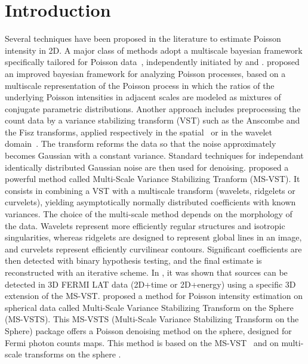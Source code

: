 \chapter{Introduction}
\label{ch_msvst_intro}

Several techniques have been proposed in the literature to estimate Poisson intensity in 2D. A major class of methods adopt a multiscale bayesian framework specifically tailored for Poisson data~\citep{Nowak2000}, independently initiated by \citet{wave:timmermann99} and \citet{Kolaczyk1999}. \citet{Lefkimmiatis} proposed an improved bayesian framework for analyzing Poisson processes, based on a multiscale representation of the Poisson process in which the ratios of the underlying Poisson intensities in adjacent scales are modeled as mixtures of conjugate parametric distributions. Another approach includes preprocessing the count data by a variance stabilizing transform (VST) such as the Anscombe \citep{rest:anscombe48} and the Fisz \citep{rest:nason04} transforms, applied respectively 
in the spatial~\citep{rest:donoho93_2} or in the wavelet domain~\citep{Fryzlewicz2004}. The transform reforms the data so that the noise approximately becomes Gaussian with a constant variance. Standard techniques for independant identically distributed Gaussian noise are then used for denoising. \citet{starck:zhang07} proposed a powerful method called Multi-Scale Variance Stabilizing Tranform (MS-VST). It consists in combining a VST with a multiscale transform (wavelets, ridgelets or curvelets), yielding asymptotically normally distributed coefficients with known variances. The choice of the multi-scale method depends on the morphology of the data. Wavelets represent more efficiently regular structures and isotropic singularities, whereas ridgelets are designed to represent global lines in an image, and curvelets represent efficiently curvilinear contours. Significant coefficients are then detected with binary hypothesis testing, and the final estimate is reconstructed with an iterative scheme. In \citet{Starck09:fermi3d}, it was shown that sources can be detected in 3D FERMI LAT data (2D+time or 2D+energy) using a specific 3D extension of the MS-VST.
 \citet{Schmitt} proposed a method for Poisson intensity estimation on spherical data called Multi-Scale Variance Stabilizing Transform on the Sphere (MS-VSTS). This MS-VSTS (Multi-Scale Variance Stabilizing Transform on the Sphere) package offers a Poisson denoising method on the sphere, designed for Fermi photon counts maps.
This method is based on the MS-VST~\citep{starck:zhang07} and on multi-scale transforms on the sphere \citep{starck2006,inpainting:abrial06,starck:abrial08}.

